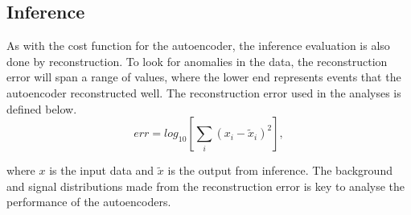 


\subsection{Inference}\label{sec:ae_inference}
As with the cost function for the autoencoder, the inference evaluation is also done by reconstruction. 
To look for anomalies in the data, the reconstruction error will span a range of values, where the 
lower end represents events that the autoencoder reconstructed well. The reconstruction error used 
in the analyses is defined below. 
\begin{equation}
    err = log_{10} \left[ \sum_i (x_i - \tilde{x}_i)^2 \right],
\end{equation}

where $x$ is the input data and $\tilde{x}$ is the output from inference. The background and signal 
distributions made from the reconstruction error is key to analyse the performance of the autoencoders.
